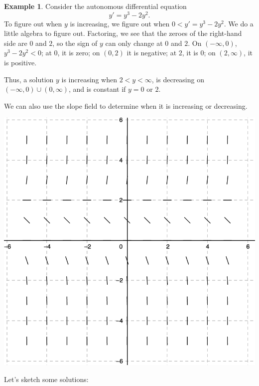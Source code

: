 \documentclass[12pt]{amsart}
\numberwithin{equation}{section}
\theoremstyle{plain} %
\theoremstyle{definition}
\newtheorem{ex}[equation]{Example}
\theoremstyle{remark}
\begin{document}
\begin{ex}
Consider the autonomous differential equation 
\[ y' = y^3 - 2y^2.\]
To figure out when $y$ is increasing, we figure out when $0<y' =  y^3 - 2y^2$.
We do a little algebra to figure out. Factoring, we see that the zeroes of the right-hand side are $0$ and $2$, so the sign of $y$ can only change at $0$ and $2$. On $(-\infty, 0)$, $y^3 - 2y^2<0$; at $0$, it is zero; on $(0,2)$ it is negative; at $2$, it is $0$; on $(2,\infty)$, it is positive.

Thus, a solution $y$ is increasing when $2 < y <\infty$, is decreasing on $(-\infty,0) \cup (0,\infty)$, and is constant if $y=0$ or $2$.

We can also use the slope field to determine when it is increasing or decreasing.
\begin{center}\includegraphics[scale=.5]{sf5}\end{center}
Let's sketch some solutions:

\end{ex}
\end{document}
